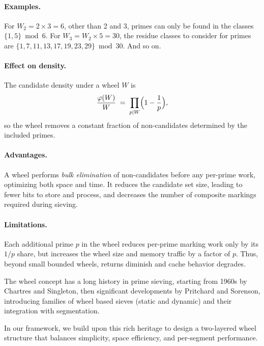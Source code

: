 \documentclass{article}
\begin{document}
\paragraph{Examples.}
For $W_2= 2\times 3=6$, other than 2 and 3, primes can only be found in the classes $\{1,5\}\bmod 6$. 
For $W_3=W_2 \times 5=30$, the residue classes to consider for primes are $\{1,7,11,13,17,19,23,29\} \bmod 30$. And so on.

\paragraph{Effect on density.}
The candidate density under a wheel $W$ is
\[
\frac{\varphi(W)}{W} \;=\; \prod_{p\mid W}\Bigl(1-\frac{1}{p}\Bigr),
\]
so the wheel removes a constant fraction of non-candidates determined by the included primes.

\paragraph{Advantages.}
A wheel performs \emph{bulk elimination} of non-candidates before any per-prime work, optimizing both space and time. It reduces the candidate set size, leading to fewer bits to store and process, and decreases the number of composite markings required during sieving.

\paragraph{Limitations.}
Each additional prime \(p\) in the wheel reduces per-prime marking work only by its \(1/p\) share, but increases the wheel size and memory traffic by a factor of \(p\). Thus, beyond small bounded wheels, returns diminish and cache behavior degrades.

The wheel concept has a long history in prime sieving, starting from 1960s by Chartres and Singleton, then significant developments by Pritchard and Sorenson, introducing families of wheel based sieves (static and dynamic) and their integration with segmentation.

In our framework, we build upon this rich heritage to design a two-layered wheel structure that balances simplicity, space efficiency, and per-segment performance.
\end{document}
